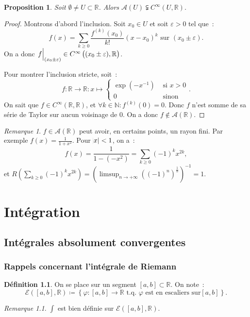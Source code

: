 \documentclass{report}
\newtheorem{prp}[thm]{Proposition}
\theoremstyle{definition}
\newtheorem{déf}[thm]{Définition}
\theoremstyle{remark}
\newtheorem*{rmq}{Remarque}
\newcommand{\R}{\mathbb R}
\newcommand{\N}{\mathbb N}
\newcommand{\tq}{\text{ t.q. }}
\newcommand{\El}[2]{\mathcal E\!\left(#1, #2\right)}
\newcommand{\restr}[2]{\left.#1\vphantom{\big|}\right|_{#2}}
\newcommand{\pinfty}{{+\infty}}
\begin{document}
			\begin{prp} Soit $\emptyset \neq U \subset \R$. Alors $\mathcal A(U) \subsetneqq C^\infty(U, \R)$.
			\end{prp}

			\begin{proof} Montrons d'abord l'inclusion. Soit $x_0 \in U$ et soit $\varepsilon > 0$ tel que~:
			\[f(x) = \sum_{k \geq 0}\frac {f^{(k)}(x_0)}{k!}(x-x_0)^k \text{ sur } (x_0 \pm \varepsilon).\]
			On a donc $\restr f {(x_0 \pm \varepsilon)} \in C^\infty\left((x_0 \pm \varepsilon), \R\right)$.

			Pour montrer l'inclusion stricte, soit~:
			\[f : \R \to \R : x \mapsto \begin{cases}\exp(-x^{-1}) &\text{ si } x > 0 \\0 &\text{ sinon}\end{cases}.\]
			On sait que $f \in C^\infty(\R, \R)$, et $\forall k \in \N : f^{(k)}(0) = 0$. Donc $f$ n'est somme de sa série de Taylor sur aucun voisinage de $0$.
			On a donc $f \not \in \mathcal A(\R)$.
			\end{proof}

			\begin{rmq} $f \in \mathcal A(\R)$ peut avoir, en certains points, un rayon fini. Par exemple $f(x) = \frac 1{1 + x^2}$. Pour $\abs x < 1$, on a~:
			\[f(x) = \frac 1{1 - (-x^2)} = \sum_{k \geq 0}(-1)^kx^{2k},\]
			et $R\left(\sum_{k \geq 0}(-1)^kx^{2k}\right) = \left(\limsup_{n \to \pinfty}((-1)^n)^{\frac 1n}\right)^{-1} = 1$.
			\end{rmq}

\chapter{Intégration}
	\section{Intégrales absolument convergentes}
		\subsection{Rappels concernant l'intégrale de Riemann}
			\begin{déf} On se place sur un segment $[a, b] \subset \R$. On note~:
			\[\El {[a, b]}\R \coloneqq \left\{\varphi : [a, b] \to \R \tq \varphi \text{ est en escaliers sur} [a, b]\right\}.\]
			\end{déf}

			\begin{rmq} $\int$ est bien définie sur $\El {[a, b]}\R$.
			\end{rmq}
\end{document}
